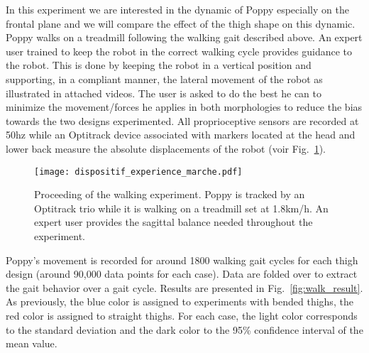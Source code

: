 In this experiment we are interested in the dynamic of Poppy especially on the frontal plane and we will compare the effect of the thigh shape on this dynamic. Poppy walks on a treadmill following the walking gait described above. An expert user trained to keep the robot in the correct walking cycle provides guidance to the robot. This is done by keeping the robot in a vertical position and supporting, in a compliant manner, the lateral movement of the robot as illustrated in attached videos. The user is asked to do the best he can to minimize the movement/forces he applies in both morphologies to reduce the bias towards the two designs experimented. All proprioceptive sensors are recorded at 50hz while an Optitrack device associated  with markers located at the head and lower back measure the absolute displacements of the robot (voir Fig.~\ref{fig:walking_experiment}).

\begin{figure}[!h]
    \centering
    \texttt{[image: dispositif\_experience\_marche.pdf]}
    \caption{Proceeding of the walking experiment.
    Poppy is tracked by an Optitrack trio while it is walking on a treadmill set at 1.8km/h.
    An expert user provides the sagittal balance needed throughout the experiment.}
    \label{fig:walking_experiment}
\end{figure}

Poppy’s movement is recorded for around 1800 walking gait cycles for each thigh design (around 90,000 data points for each case). Data are folded over to extract the gait behavior over a gait cycle. Results are presented in Fig.~\ref{fig:walk_result}. As previously, the blue color is assigned to experiments with bended thighs, the red color is assigned to straight thighs. For each case, the light color corresponds to the standard deviation and the dark color to the 95\% confidence interval of the mean value.

